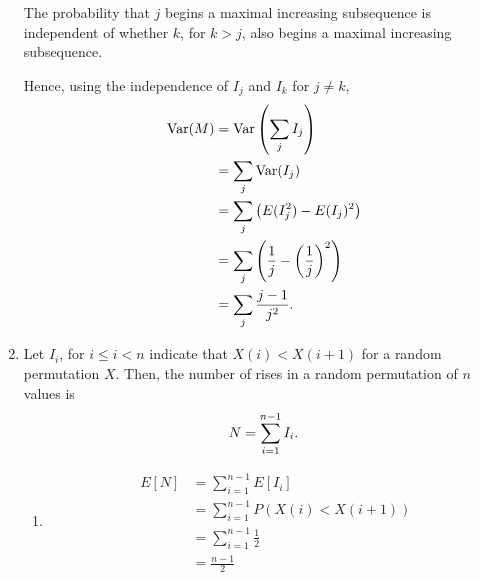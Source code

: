 \documentclass{article}
\DeclareMathOperator{\Var}{Var}
\begin{document}
\begin{enumerate}
    The probability that $j$ begins a maximal increasing subsequence is independent of whether
    $k$, for $k>j$, also begins a maximal increasing subsequence.

    Hence, using the independence of $I_j$ and $I_k$ for $j \neq k$,
    \[\begin{split}
    \Var(M) & = \Var\left(\sum_j{I_j}\right) \\
            & = \sum_j{\Var(I_j)} \\
            & = \sum_j\left(E(I_j^2) - E(I_j)^2\right) \\
            & = \sum_j{\left(\frac{1}{j} - \left(\frac{1}{j}\right)^2\right)} \\
            & = \sum_j{\frac{j-1}{j^2}}\text.
    \end{split}\]
\item
    Let $I_i$, for $i \leq i < n$ indicate that $X(i) < X(i+1)$ for a random permutation $X$.
    Then, the number of rises in a random permutation of $n$ values is
    \[ N = \sum_{i=1}^{n-1}{I_i}\text. \]
    \begin{enumerate}
    \item
        \[\begin{split}
        E[N]    & = \sum_{i=1}^{n-1}{E[I_i]} \\
                & = \sum_{i=1}^{n-1}{P(X(i) < X(i+1))} \\
                & = \sum_{i=1}^{n-1}\frac{1}{2} \\
                & = \frac{n-1}{2}
        \end{split}\]
    \end{enumerate}
\end{enumerate}
\end{document}

